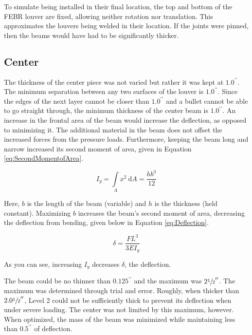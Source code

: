 \documentclass[12pt,letterpaper]{report}
\newcommand{\inchsign}{^{\prime\prime}} %
\begin{document}
		To simulate being installed in their final location, the top and bottom of the FEBR louver are fixed, allowing neither rotation nor translation.  This approximates the louvers being welded in their location.  If the joints were pinned, then the beams would have had to be significantly thicker.
		
		\subsection{Center}
		The thickness of the center piece was not varied but rather it was kept at $1.0\inchsign$.  The minimum separation between any two surfaces of the louver is $1.0\inchsign$.  Since the edges of the next layer cannot be closer than $1.0\inchsign$ and a bullet cannot be able to go straight through, the minimum thickness of the center beam is $1.0\inchsign$.  An increase in the frontal area of the beam would increase the deflection, as opposed to minimizing it.  The additional material in the beam does not offset the increased forces from the pressure loads.  Furthermore, keeping the beam long and narrow increased its second moment of area, given in Equation \ref{eq:SecondMomentofArea}.
		
		\begin{equation}
		I_y = \int\limits_{A} x^2 \: \mathrm{d}A = \frac{h b^3}{12}
		\label{eq:SecondMomentofArea}
		\end{equation}
		
		Here, $b$ is the length of the beam (variable) and $h$ is the thickness (held constant).  Maximizing $b$ increases the beam's second moment of area, decreasing the deflection from bending, given below in Equation \ref{eq:Deflection}.
		
		\begin{equation}
		\delta = \frac{F L^3}{3 E I_y}
		\label{eq:Deflection}
		\end{equation}
		
		As you can see, increasing $I_y$ decreases $\delta$, the deflection.
		
		The beam could be no thinner than $0.125\inchsign$ and the maximum was $2\sfrac{1}{2}\inchsign$.  The maximum was determined through trial and error.  Roughly, when thicker than $2.0\sfrac{1}{2}\inchsign$, Level 2 could not be sufficiently thick to prevent its deflection when under severe loading.  The center was not limited by this maximum, however.  When optimized, the mass of the beam was minimized while maintaining less than $0.5\inchsign$ of deflection.
		
\end{document}
